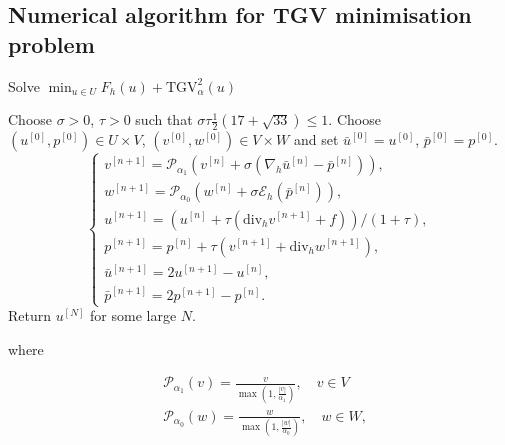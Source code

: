 \documentclass{article}
\begin{document}
\subsection{
Numerical
algorithm for TGV minimisation problem
}


\begin{algorithm}[H]
    \caption{Solve $\min_{u \in U} F_h(u) + \mathrm{TGV}^2_{\alpha}(u)$}
    \begin{algorithmic}[1]
    \State Choose $\sigma > 0$, $\tau > 0$ such that $\sigma \tau \frac{1}{2} (17 + \sqrt{33}) \leq 1$.
    \State Choose $(u^{[0]}, p^{[0]}) \in U \times V$, $(v^{[0]}, w^{[0]}) \in V \times W$ and set $\bar{u}^{[0]} = u^{[0]}$, $\bar{p}^{[0]} = p^{[0]}$.
        \State \begin{equation*}
        \begin{cases}
        v^{[n+1]} = \mathcal{P}_{\alpha_1} \left( v^{[n]} + \sigma (\nabla_h \bar{u}^{[n]} - \bar{p}^{[n]}) \right), \\
        w^{[n+1]} = \mathcal{P}_{\alpha_0} \left( w^{[n]} + \sigma \mathcal{E}_h (\bar{p}^{[n]}) \right), \\
        u^{[n+1]} = \left( u^{[n]} + \tau (\text{div}_h v^{[n+1]} + f) \right) / ( 1 + \tau ), \\
        p^{[n+1]} = p^{[n]} + \tau (v^{[n+1]} + \text{div}_h w^{[n+1]}), \\
        \bar{u}^{[n+1]} = 2u^{[n+1]} - u^{[n]}, \\
        \bar{p}^{[n+1]} = 2p^{[n+1]} - p^{[n]}.
        \end{cases}
        \end{equation*}
    \EndFor
    \State Return $u^{[N]}$ for some large $N$.
    \end{algorithmic}
    \label{alg:pdhg}
\end{algorithm}

where 

\begin{equation}
    \begin{aligned}
    & \mathcal{P}_{\alpha_1}(v) = \frac{v}{\max \left(1, \frac{|v|}{\alpha_1}\right)}, \quad v \in V \\
    & \mathcal{P}_{\alpha_0}(w) = \frac{w}{\max \left(1, \frac{|w|}{\alpha_0}\right)}, \quad w \in W,
    \end{aligned}
\end{equation}
\end{document}

